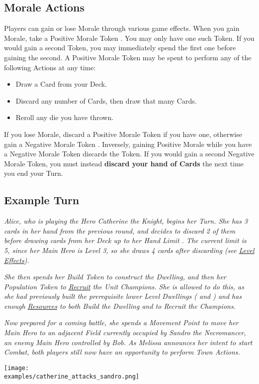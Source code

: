 \begin{multicols}{2}
\subsection*{Morale Actions}
Players can gain or lose Morale through various game effects.
When you gain Morale, take a Positive Morale Token .
You may only have one such Token.
If you would gain a second Token, you may immediately spend the first one before gaining the second.
A Positive Morale Token may be spent to perform any of the following Actions at any time:
\begin{itemize}
  \item Draw a Card from your Deck.
  \item Discard any number of Cards, then draw that many Cards.
  \item Reroll any die you have thrown.
\end{itemize}
If you lose Morale, discard a Positive Morale Token  if you have one, otherwise gain a Negative Morale Token .
Inversely, gaining Positive Morale while you have a Negative Morale Token discards the Token.
If you would gain a second Negative Morale Token, you must instead \textbf{discard your hand of Cards} the next time you end your Turn.\par


\subsection*{Example Turn}

\textit{Alice, who is playing the Hero Catherine the Knight, begins her Turn.
She has 3 cards in her hand from the previous round, and decides to discard 2 of them before drawing cards from her Deck up to her Hand Limit .
The current limit is 5, since her Main Hero is Level 3, so she draws 4 cards after discarding (see \hyperlink{Level}{Level Effects}).}\par
\textit{She then spends her Build Token to construct the  Dwelling, and then her Population Token to \hyperlink{Units}{Recruit} the  Unit Champions.
She is allowed to do this, as she had previously built the prerequisite lower Level Dwellings ( and ) and has enough \hyperlink{Resources}{Resources} to both Build the Dwelling and to Recruit the Champions.}\par
\textit{Now prepared for a coming battle, she spends a Movement Point to move her Main Hero to an adjacent Field currently occupied by Sandro the Necromancer, an enemy Main Hero controlled by Bob.
As Melissa announces her intent to start Combat, both players still now have an opportunity to perform Town Actions.}\par

\texttt{[image: \\examples/catherine\_attacks\_sandro.png]}

\end{multicols}
